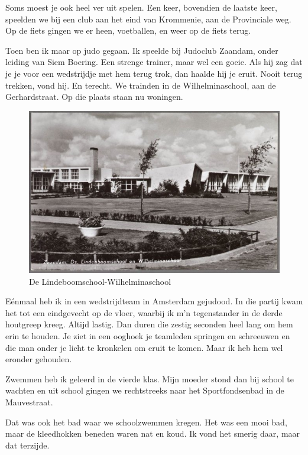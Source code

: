 \documentclass[10pt,twoside, openright]{memoir}
\begin{document}
Soms moest je ook heel ver uit spelen. Een keer, bovendien de laatste keer, speelden we bij een club aan het eind van Krommenie, aan de Provinciale weg. Op de fiets gingen we er heen, voetballen, en weer op de fiets terug. 

Toen ben ik maar op judo gegaan. Ik speelde bij Judoclub Zaandam, onder leiding van Siem Boering. Een strenge trainer, maar wel een goeie. Als hij zag dat je je voor een wedstrijdje met hem terug trok, dan haalde hij je eruit. Nooit terug trekken, vond hij. En terecht. We trainden in de Wilhelminaschool, aan de Gerhardstraat. Op die plaats staan nu woningen.

\begin{figure}
\includegraphics[width=\textwidth]{img/76schooljudo}
\caption*{\footnotesize De Lindeboomschool-Wilhelminaschool }
\end{figure}

Eénmaal heb ik in een wedstrijdteam in Amsterdam gejudood. In die partij kwam het tot een eindgevecht op de vloer, waarbij ik m’n tegenstander in de derde houtgreep kreeg. Altijd lastig. Dan duren die zestig seconden heel lang om hem erin te houden. Je ziet in een ooghoek je teamleden springen en schreeuwen en die man onder je licht te kronkelen om eruit te komen. Maar ik heb hem wel eronder gehouden. 

Zwemmen heb ik geleerd in de vierde klas. Mijn moeder stond dan bij school te wachten en uit school gingen we rechtstreeks naar het Sportfondsenbad in de Mauvestraat. 

Dat was ook het bad waar we schoolzwemmen kregen. Het was een mooi bad, maar de kleedhokken beneden waren nat en koud. Ik vond het smerig daar, maar dat terzijde. 
\end{document}
